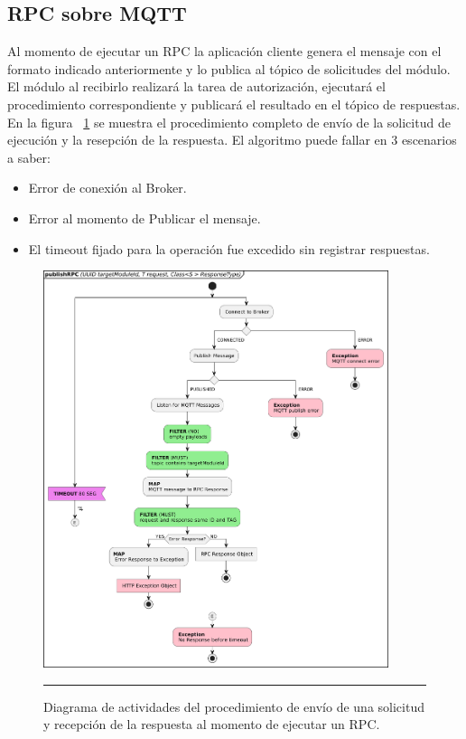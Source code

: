 \subsection{RPC sobre MQTT}
Al momento de ejecutar un RPC la aplicación cliente genera el mensaje con el formato indicado anteriormente y lo publica al tópico de solicitudes del módulo. El módulo al recibirlo realizará la tarea de autorización, ejecutará el procedimiento correspondiente y publicará el resultado en el tópico de respuestas.
En la figura ~\ref{fig:act_publish_rpc} se muestra el procedimiento completo de envío de la solicitud de ejecución y la resepción de la respuesta.
El algoritmo puede fallar en 3 escenarios a saber:
\begin{itemize}
	\item Error de conexión al Broker.
	\item Error al momento de Publicar el mensaje.
	\item El timeout fijado para la operación fue excedido sin registrar respuestas.
\end{itemize}

\begin{figure}[htbp]
	\centering
	\includegraphics[width=0.9\textwidth]{Figures/iter3/ACT_publishRPC_ink.png}
	\rule{35em}{1pt}
	\caption[UML Diagram]{Diagrama de actividades del procedimiento de envío de una solicitud y recepción de la respuesta al momento de ejecutar un RPC.}
	\label{fig:act_publish_rpc}
\end{figure}

